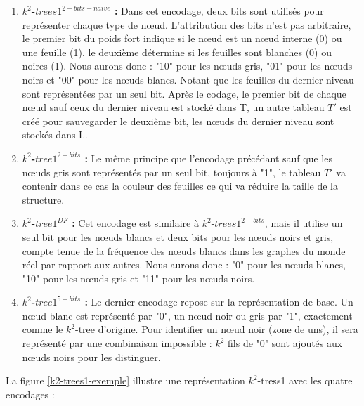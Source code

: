 \begin{enumerate}[label=$\bullet$]
\item \textbf{ $k^2$-$trees1^{2-bits-naive}$ :} Dans cet encodage, deux bits sont utilisés pour représenter chaque type de nœud. L'attribution des bits n'est pas arbitraire, le premier bit du poids fort indique si le nœud est un nœud interne (0) ou une feuille (1), le deuxième détermine si les feuilles sont blanches (0) ou noires (1). Nous aurons donc : "10" pour les nœuds gris, "01" pour les nœuds noirs et "00" pour les nœuds blancs. Notant que les feuilles du dernier niveau sont représentées par un seul bit.
Après le codage, le premier bit de chaque nœud sauf ceux du dernier niveau est stocké dans T, un autre tableau $T'$ est créé pour sauvegarder le deuxième bit, les nœuds du dernier niveau sont stockés dans L.
\item \textbf{ $k^2$-$tree1^{2-bits}$ :} Le même principe que l'encodage précédant sauf que les nœuds gris sont représentés par un seul bit, toujours à "1", le tableau $T'$ va contenir dans ce cas la couleur des feuilles ce qui va réduire la taille de la structure.

\item \textbf{ $k^2$-$tree1^{DF}$ :} Cet encodage est similaire à $k^2$-$trees1^{2-bits}$, mais il utilise un seul bit pour les nœuds blancs et deux bits pour les nœuds noirs et gris, compte tenue de la fréquence des nœuds blancs dans les graphes du monde réel par rapport aux autres. Nous aurons donc : "0" pour les nœuds blancs, "10" pour les nœuds gris et "11" pour les nœuds noirs.

\item \textbf{ $k^2$-$tree1^{5-bits}$ :} Le dernier encodage repose sur la représentation de base. Un nœud blanc est représenté par "0", un nœud noir ou gris par "1", exactement comme le $k^2$-tree d'origine. Pour identifier un nœud noir (zone de uns), il sera représenté par une combinaison impossible : $k^2$ fils de "0" sont ajoutés aux nœuds noirs pour les distinguer.
\end{enumerate}


La figure \ref{k2-trees1-exemple} illustre une représentation $k^2$-tress1 avec les quatre encodages \citep{de2014new} : 


